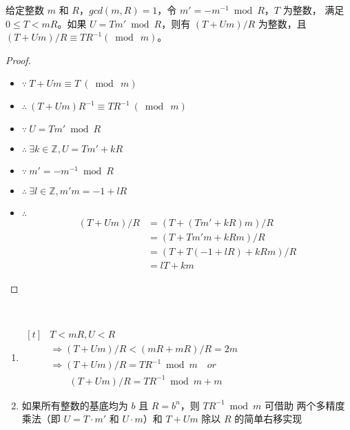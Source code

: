 \begin{fact}[蒙哥马利归约]\label{reduction-basis}
  给定整数 \(m\) 和 \(R\)，\(gcd(m,R)=1\)，令 \(m'=-m^{-1}\bmod R\)，\(T\) 为整数，
  满足 \(0\le T < mR\)。如果 \(U = Tm'\bmod R\)，则有 \((T+Um)/R\) 为整数，且 \((T+Um)/R \equiv TR^{-1} (\bmod\ m)\)。

  \begin{proof}\
    \begin{itemize}[label={}]
      \item \(\because\ T+Um\equiv T\ (\bmod\ m)\)
      \item \(\therefore\ (T+Um)R^{-1}\equiv TR^{-1}\ (\bmod\ m)\)
      \item \(\because\ U = Tm'\bmod R\)
      \item \(\therefore\ \exists k\in \mathbb{Z}, U=Tm'+kR\)
      \item \(\because\ m'=-m^{-1}\bmod R\)
      \item \(\therefore\ \exists l\in \mathbb{Z}, m'm=-1+lR\)
      \item \(\therefore\)
        \begin{align*}
          (T+Um)/R &=(T+(Tm'+kR)m)/R \\
            &=(T+Tm'm+kRm)/R \\
            &=(T+T(-1+lR)+kRm)/R \\
            &=lT+km 
        \end{align*}
    \end{itemize}
  \end{proof}
\end{fact}

\begin{implication}\
  \begin{enumerate}
    \item \(
      \begin{aligned}[t]
        &T<mR, U<R \\
        &\Rightarrow (T+Um)/R<(mR+mR)/R=2m \\
        &\Rightarrow (T+Um)/R=TR^{-1}\bmod m \quad or\\
        &\qquad (T+Um)/R=TR^{-1}\bmod m + m
      \end{aligned}
      \)
    \item 如果所有整数的基底均为 \(b\) 且 \(R=b^n\)，则 \(TR^{-1}\bmod m\) 可借助
      两个多精度乘法（即 \(U=T\cdot m'\) 和 \(U\cdot m\)）和 \(T+Um\) 除以 \(R\)
      的简单右移实现
  \end{enumerate}
\end{implication}

